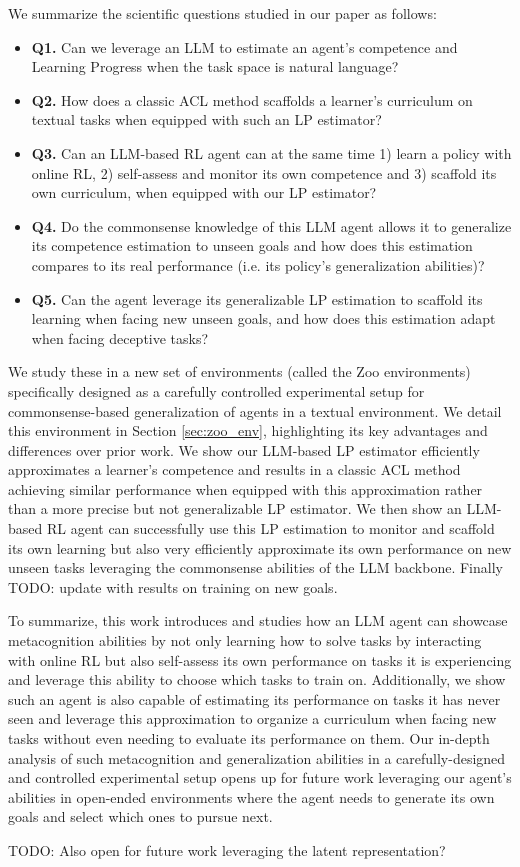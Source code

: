 We summarize the scientific questions studied in our paper as follows:
\begin{itemize}
    \item \textbf{Q1.} Can we leverage an LLM to estimate an agent's competence and Learning Progress when the task space is natural language?
    \item \textbf{Q2.} How does a classic ACL method scaffolds a learner's curriculum on textual tasks when equipped with such an LP estimator?
    \item \textbf{Q3.} Can an LLM-based RL agent can at the same time 1) learn a policy with online RL, 2) self-assess and monitor its own competence and 3) scaffold its own curriculum, when equipped with our LP estimator?
    \item \textbf{Q4.} Do the commonsense knowledge of this LLM agent allows it to generalize its competence estimation to unseen goals and how does this estimation compares to its real performance (i.e. its policy's generalization abilities)?
    \item \textbf{Q5.} Can the agent leverage its generalizable LP estimation to scaffold its learning when facing new unseen goals, and how does this estimation adapt when facing deceptive tasks? 
\end{itemize}

We study these in a new set of environments (called the Zoo environments) specifically designed as a carefully controlled experimental setup for commonsense-based generalization of agents in a textual environment. We detail this environment in Section \ref{sec:zoo_env}, highlighting its key advantages and differences over prior work.
We show our LLM-based LP estimator efficiently approximates a learner's competence and results in a classic ACL method achieving similar performance when equipped with this approximation rather than a more precise but not generalizable LP estimator. We then show an LLM-based RL agent can successfully use this LP estimation to monitor and scaffold its own learning but also very efficiently approximate its own performance on new unseen tasks leveraging the commonsense abilities of the LLM backbone. Finally TODO: update with results on training on new goals.

To summarize, this work introduces and studies how an LLM agent can showcase metacognition abilities by not only learning how to solve tasks by interacting with online RL but also self-assess its own performance on tasks it is experiencing and leverage this ability to choose which tasks to train on. Additionally, we show such an agent is also capable of estimating its performance on tasks it has never seen and leverage this approximation to organize a curriculum when facing new tasks without even needing to evaluate its performance on them. Our in-depth analysis of such metacognition and generalization abilities in a carefully-designed and controlled experimental setup opens up for future work leveraging our agent's abilities in open-ended environments where the agent needs to generate its own goals and select which ones to pursue next.

TODO: Also open for future work leveraging the latent representation?